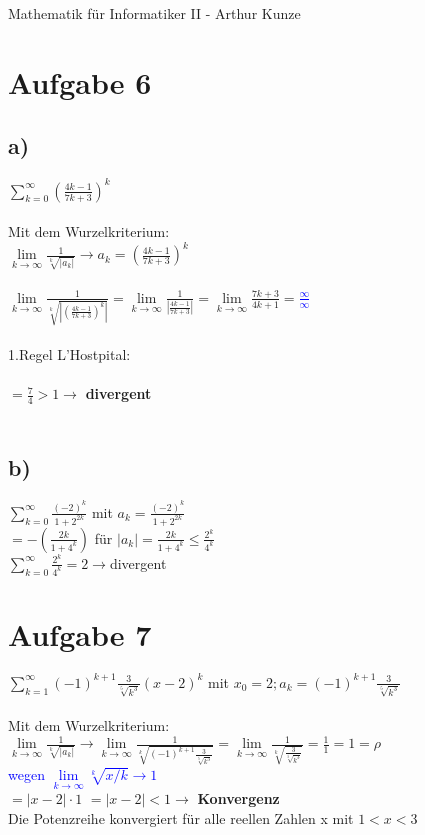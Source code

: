\documentclass[12pt,a4paper]{article}
\begin{document}
Mathematik für Informatiker II - Arthur Kunze
\section*{Aufgabe 6}
\subsection*{a)}
$\sum\limits_{k=0}^{\infty}(\frac{4k-1}{7k+3})^k$\\
\\
Mit dem Wurzelkriterium:\\
$\lim\limits_{k\rightarrow\infty}\frac{1}{\sqrt[k]{|a_k|}} \rightarrow a_k=(\frac{4k-1}{7k+3})^k$\\
\\
$\lim\limits_{k\rightarrow\infty}\frac{1}{\sqrt[k]{|(\frac{4k-1}{7k+3})^k|}} = \lim\limits_{k\rightarrow\infty}\frac{1}{|\frac{4k-1}{7k+3}|} = \lim\limits_{k\rightarrow\infty}\frac{7k+3}{4k+1}=$\textcolor{blue}{$\frac{\infty}{\infty}$}\\
\\
1.Regel L'Hostpital:\\
\\
$=\frac{7}{4} > 1 \rightarrow$ \textbf{divergent}\\
\\
\subsection*{b)}
$\sum\limits_{k=0}^{\infty}\frac{(-2)^k}{1+2^{2k}}$ mit $a_k=\frac{(-2)^k}{1+2^{2k}}$\\
$= -(\frac{2k}{1+4^k})$ für $|a_k| = \frac{2k}{1+4^k} \leq \frac{2^k}{4^k}$\\
$\sum\limits_{k=0}^{\infty}\frac{2^k}{4^k} = 2 \rightarrow $divergent
\newpage
\section*{Aufgabe 7}
$\sum\limits_{k=1}^{\infty}(-1)^{k+1}\frac{3}{\sqrt[5]{k^3}}(x-2)^k$ mit $x_0 = 2; a_k=(-1)^{k+1}\frac{3}{\sqrt[5]{k^3}}$\\
\\
Mit dem Wurzelkriterium:\\
$\lim\limits_{k\rightarrow\infty}\frac{1}{\sqrt[k]{|a_k|}} \rightarrow \lim\limits_{k\rightarrow\infty}\frac{1}{\sqrt[k]{(-1)^{k+1}\frac{3}{\sqrt[5]{k^3}}}} = \lim\limits_{k\rightarrow\infty}\frac{1}{\sqrt[k]{\frac{3}{\sqrt[5]{k^3}}}} = \frac{1}{1} = 1 = \rho$\\
\textcolor{blue}{wegen $\lim\limits_{k\rightarrow\infty}\sqrt[k]{x / k} \rightarrow 1$}\\
$= |x-2| \cdot 1$
$= |x-2| < 1 \rightarrow$ \textbf{Konvergenz}\\
Die Potenzreihe konvergiert für alle reellen Zahlen x mit $1<x<3$\\
\end{document}

